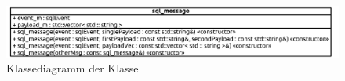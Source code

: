 \begin{figure}[ht]
  \centering
  \includegraphics[width=\textwidth]{content/hauptteil/umsetzungPoC/backend/uml/classesOfOverview/sql_message.pdf}
  \caption{Klassediagramm der Klasse }
  \label{fig:backend:classDiag:sqlMsg}
\end{figure}
